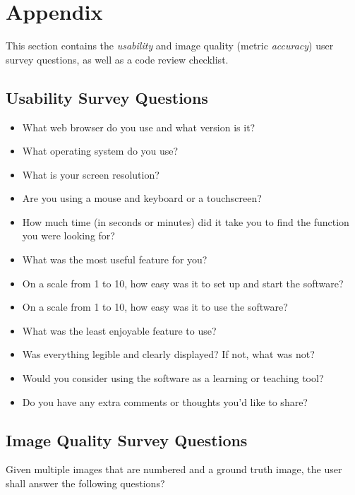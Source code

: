 \documentclass[12pt, titlepage]{article}
\begin{document}
\newpage
\clearpage




\newpage

\section{Appendix}

This section contains the \textit{usability} and image quality (metric \textit{accuracy}) 
user survey questions, as well as a code review checklist.

\subsection{Usability Survey Questions} \label{survey_usability}


\begin{itemize}
  \item{What web browser do you use and what version is it?}
  \item{What operating system do you use?}
  \item{What is your screen resolution?}
  \item{Are you using a mouse and keyboard or a touchscreen?}
  \item{How much time (in seconds or minutes) did it take you to find the function you were looking for?}
  \item{What was the most useful feature for you?}
  \item{On a scale from 1 to 10, how easy was it to set up and start the software?}
  \item{On a scale from 1 to 10, how easy was it to use the software?}
  \item{What was the least enjoyable feature to use?}
  \item{Was everything legible and clearly displayed? If not, what was not?}
  \item{Would you consider using the software as a learning or teaching tool?}
  \item{Do you have any extra comments or thoughts you'd like to share?}
\end{itemize}

\subsection{Image Quality Survey Questions} \label{survey_metric}
Given multiple images that are numbered and a ground truth image, 
the user shall answer the following questions?
\end{document}
